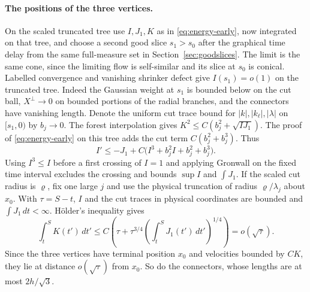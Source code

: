 \paragraph{The positions of the three vertices.}
On the scaled truncated tree use \(I,J_1,K\) as in
\eqref{eq:energy-early}, now integrated on that tree, and choose a
second good slice \(s_1>s_0\) after the graphical time delay from the
same full-measure set in Section~\ref{sec:goodslices}. The limit is
the same cone, since the limiting flow is self-similar and its
slice at \(s_0\) is conical. Labelled convergence and vanishing
shrinker defect give \(I(s_1)=o(1)\) on the truncated tree.
Indeed the Gaussian weight at \(s_1\) is bounded below on the cut
ball, \(X^\perp\to0\) on bounded portions of the radial branches,
and the connectors have vanishing length. Denote the uniform cut trace bound for
\(|k|,|k_\ell|,|\lambda|\) on \([s_1,0)\) by \(b_j\to0\).
The forest interpolation gives
\(K^2\le C(b_j^2+\sqrt{I J_1})\). The proof of
\eqref{eq:energy-early} on this tree adds the cut term
\(C(b_j^2+b_j^3)\). Thus
\[
 I'\le -J_1+C\bigl(I^3+b_j^2 I+b_j^2+b_j^3\bigr).
\]
Using \(I^3\le I\) before a first crossing of \(I=1\) and applying
Gronwall on the fixed time interval excludes the crossing and bounds
\(\sup I\) and \(\int J_1\). If the scaled cut radius is \(\varrho\),
fix one large \(j\) and use the physical truncation of radius
\(\varrho/\lambda_j\) about \(x_0\). With \(\tau=S-t\), \(I\) and
the cut traces in physical coordinates are bounded and
\(\int J_1\,dt<\infty\). Hölder's inequality gives
\[
 \int_t^S K(t')\,dt'\le
 C\left(\tau+\tau^{3/4}\left(\int_t^S J_1(t')\,dt'\right)^{1/4}\right)
 =o(\sqrt{\tau}).
\]
Since the three vertices have terminal position \(x_0\) and velocities
bounded by \(CK\), they lie at distance \(o(\sqrt{\tau})\) from \(x_0\).
So do the connectors, whose lengths are at most \(2h/\sqrt3\).

